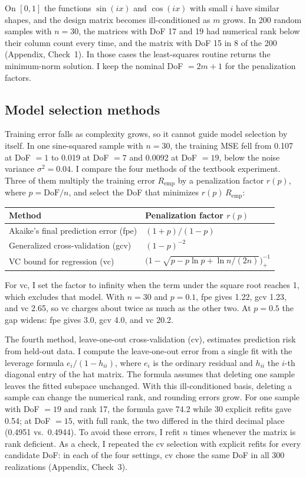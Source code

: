 On $[0, 1]$ the functions $\sin(ix)$ and $\cos(ix)$ with small $i$ have similar shapes, and the design matrix becomes
ill-conditioned as $m$ grows. In 200 random samples with $n = 30$, the matrices with DoF 17 and 19 had numerical rank
below their column count every time, and the matrix with DoF 15 in 8 of the 200 (Appendix, Check~1). In those cases the least-squares routine returns the minimum-norm solution.
I keep the nominal DoF $= 2m + 1$ for the penalization factors.

\subsection*{Model selection methods}
Training error falls as complexity grows, so it cannot guide model selection by itself. In one sine-squared sample
with $n = 30$, the training MSE fell from 0.107 at DoF $= 1$ to 0.019 at DoF $= 7$ and 0.0092 at DoF $= 19$, below
the noise variance $\sigma^2 = 0.04$. I compare the four methods of the textbook experiment. Three of them multiply
the training error $R_{\text{emp}}$ by a penalization factor $r(p)$, where $p = \text{DoF}/n$, and select the DoF that
minimizes $r(p)\,R_{\text{emp}}$:
\begin{center}\small
\begin{tabular}{ll}
\toprule
Method & Penalization factor $r(p)$ \\
\midrule
Akaike's final prediction error (fpe) & $(1+p)/(1-p)$ \\
Generalized cross-validation (gcv) & $(1-p)^{-2}$ \\
VC bound for regression (vc) & $\bigl(1 - \sqrt{p - p\ln p + \ln n/(2n)}\bigr)_+^{-1}$ \\
\bottomrule
\end{tabular}
\end{center}
For vc, I set the factor to infinity when the term under the square root reaches 1, which excludes that model.
With $n = 30$ and $p = 0.1$, fpe gives 1.22, gcv 1.23, and vc 2.65, so vc charges about twice as much as the other
two. At $p = 0.5$ the gap widens: fpe gives 3.0, gcv 4.0, and vc 20.2.

The fourth method, leave-one-out cross-validation (cv), estimates prediction risk from held-out data. I compute the
leave-one-out error from a single fit with the leverage formula $e_i/(1 - h_{ii})$, where $e_i$ is the ordinary
residual and $h_{ii}$ the $i$-th diagonal entry of the hat matrix. The formula assumes that deleting one sample leaves
the fitted subspace unchanged. With this ill-conditioned basis, deleting a sample can change the numerical rank, and
rounding errors grow. For one sample with DoF $= 19$ and rank 17, the formula gave 74.2 while 30 explicit refits gave
0.54; at DoF $= 15$, with full rank, the two differed in the third decimal place (0.4951 vs.\ 0.4944). To avoid these
errors, I refit $n$ times whenever the matrix is rank deficient. As a check, I repeated the cv selection with explicit
refits for every candidate DoF: in each of the four settings, cv chose the same DoF in all 300 realizations (Appendix,
Check~3).

